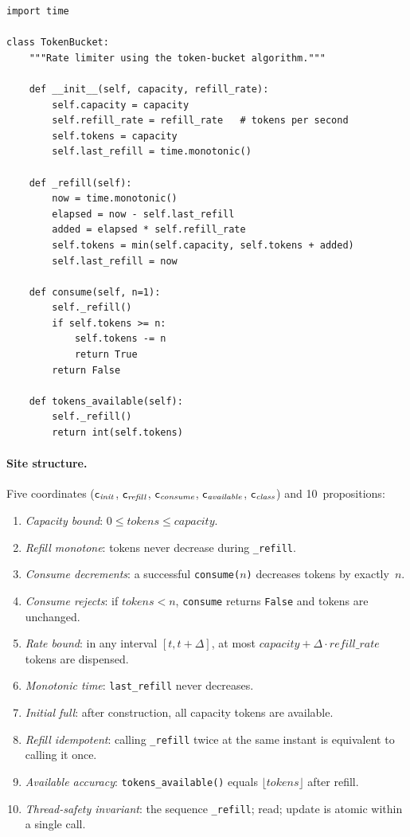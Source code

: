 \begin{lstlisting}[style=jugeo-python,caption={Token-bucket rate limiter.},label={lst:ratelimiter}]
import time

class TokenBucket:
    """Rate limiter using the token-bucket algorithm."""

    def __init__(self, capacity, refill_rate):
        self.capacity = capacity
        self.refill_rate = refill_rate   # tokens per second
        self.tokens = capacity
        self.last_refill = time.monotonic()

    def _refill(self):
        now = time.monotonic()
        elapsed = now - self.last_refill
        added = elapsed * self.refill_rate
        self.tokens = min(self.capacity, self.tokens + added)
        self.last_refill = now

    def consume(self, n=1):
        self._refill()
        if self.tokens >= n:
            self.tokens -= n
            return True
        return False

    def tokens_available(self):
        self._refill()
        return int(self.tokens)
\end{lstlisting}

\paragraph{Site structure.}
Five coordinates ($\mathsf{c}_{\mathit{init}}$,
$\mathsf{c}_{\mathit{refill}}$, $\mathsf{c}_{\mathit{consume}}$,
$\mathsf{c}_{\mathit{available}}$, $\mathsf{c}_{\mathit{class}}$) and
10~propositions:

\begin{enumerate}[nosep,label=(\roman*)]
  \item \emph{Capacity bound}: $0 \leq \mathit{tokens} \leq
    \mathit{capacity}$.
  \item \emph{Refill monotone}: tokens never decrease during
    \texttt{\_refill}.
  \item \emph{Consume decrements}: a successful \texttt{consume($n$)}
    decreases tokens by exactly~$n$.
  \item \emph{Consume rejects}: if $\mathit{tokens} < n$,
    \texttt{consume} returns \texttt{False} and tokens are unchanged.
  \item \emph{Rate bound}: in any interval $[t, t + \Delta]$, at most
    $\mathit{capacity} + \Delta \cdot \mathit{refill\_rate}$ tokens
    are dispensed.
  \item \emph{Monotonic time}: \texttt{last\_refill} never decreases.
  \item \emph{Initial full}: after construction, all capacity tokens
    are available.
  \item \emph{Refill idempotent}: calling \texttt{\_refill} twice
    at the same instant is equivalent to calling it once.
  \item \emph{Available accuracy}: \texttt{tokens\_available()}
    equals $\lfloor\mathit{tokens}\rfloor$ after refill.
  \item \emph{Thread-safety invariant}: the sequence
    \texttt{\_refill}; read; update is atomic within a single call.
\end{enumerate}

